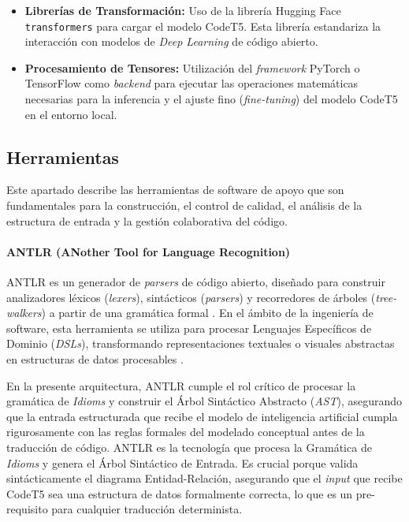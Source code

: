 \begin{itemize}
    \item \textbf{Librerías de Transformación:} Uso de la librería Hugging Face \texttt{transformers} para cargar el modelo CodeT5. Esta librería estandariza la interacción con modelos de \textit{Deep Learning} de código abierto.
    \item \textbf{Procesamiento de Tensores:} Utilización del \textit{framework} PyTorch o TensorFlow como \textit{backend} para ejecutar las operaciones matemáticas necesarias para la inferencia y el ajuste fino (\textit{fine-tuning}) del modelo CodeT5 en el entorno local.
\end{itemize}

\subsection{Herramientas}
\label{subsubsec:plataforma-herramientas}

Este apartado describe las herramientas de software de apoyo que son fundamentales para la construcción, el control de calidad, el análisis de la estructura de entrada y la gestión colaborativa del código.

\paragraph{ANTLR (ANother Tool for Language Recognition)}
ANTLR es un generador de \textit{parsers} de código abierto, diseñado para construir analizadores léxicos (\textit{lexers}), sintácticos (\textit{parsers}) y recorredores de árboles (\textit{tree-walkers}) a partir de una gramática formal \cite{parr2013definitive}. En el ámbito de la ingeniería de software, esta herramienta se utiliza para procesar Lenguajes Específicos de Dominio (\textit{DSLs}), transformando representaciones textuales o visuales abstractas en estructuras de datos procesables \cite{fowler2010dsl}. 

En la presente arquitectura, ANTLR cumple el rol crítico de procesar la gramática de \textit{Idioms} y construir el Árbol Sintáctico Abstracto (\textit{AST}), asegurando que la entrada estructurada que recibe el modelo de inteligencia artificial cumpla rigurosamente con las reglas formales del modelado conceptual antes de la traducción de código.
ANTLR es la tecnología que procesa la Gramática de \textit{Idioms} y genera el Árbol Sintáctico de Entrada. Es crucial porque valida sintácticamente el diagrama Entidad-Relación, asegurando que el \textit{input} que recibe CodeT5 sea una estructura de datos formalmente correcta, lo que es un pre-requisito para cualquier traducción determinista.

